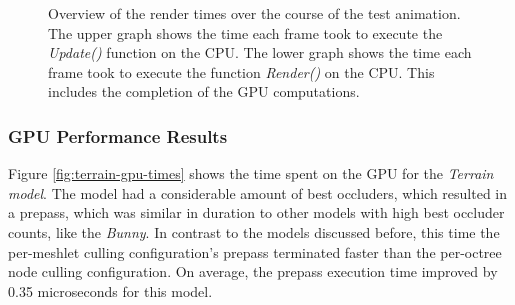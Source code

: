 \begin{figure}[!htb]              %
  \begin{center}
    \caption{Overview of the render times over the course of the test animation. The upper graph shows the time 
    each frame took to execute the \emph{Update()} function on the \ac{CPU}. The lower graph shows the time each 
    frame took to execute the function \emph{Render()} on the \ac{CPU}. This includes the completion of the 
    \ac{GPU} computations.}
    \label{plt:terrain-256-culling-cpu-time}
  \end{center}
\end{figure}

\subsubsection*{GPU Performance Results} \label{subsubsec-gpu-performance-results-terrain}

Figure \ref{fig:terrain-gpu-times} shows the time spent on the \ac{GPU} for the \emph{Terrain model}.
The model had a considerable amount of best occluders, which resulted in a prepass, which was similar 
in duration to other models with high best occluder counts, like the \emph{Bunny}. In contrast to 
the models discussed before, this time the per-meshlet culling configuration's prepass terminated faster 
than the per-octree node culling configuration. On average, the prepass execution time improved by 0.35 
microseconds for this model. \\

